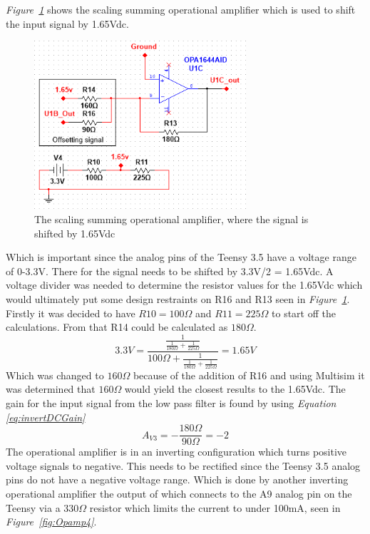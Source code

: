 \textit{Figure~\ref{fig:Opamp3}} shows the scaling summing operational amplifier which is used to shift the input signal by 1.65Vdc. 


\begin{figure}[h]
    \centering
    \includegraphics[width=0.70\textwidth]{graphics/OPamp3.png}
    \caption{The scaling summing operational amplifier, where the signal is shifted by 1.65Vdc}
    \label{fig:Opamp3}
\end{figure}


Which is important since the analog pins of the Teensy 3.5 have a voltage range of 0-3.3V.
There for the signal needs to be shifted by 3.3V/2 = 1.65Vdc.
A voltage divider was needed to determine the resistor values for the 1.65Vdc which would ultimately put some design restraints on R16 and R13 seen in \textit{Figure~\ref{fig:Opamp3}}.
Firstly it was decided to have $R10 = 100\Omega$  and $R11 = 225\Omega$ to start off the calculations.
From that R14 could be calculated as $180\Omega$.
$$3.3V = \frac{\frac{1}{\frac{1}{180\Omega}+\frac{1}{225\Omega}}}{100\Omega+\frac{1}{\frac{1}{180\Omega}+\frac{1}{225\Omega}}} = 1.65V$$
Which was changed to $160\Omega$ because of the addition of R16 and using Multisim it was determined that $160\Omega$ would yield the closest results to the 1.65Vdc.
The gain for the input signal from the low pass filter is found by using \textit{Equation \ref{eq:invertDCGain}}
$$A_{V3} = -\frac{180\Omega}{90\Omega} = -2$$
The operational amplifier is in an inverting configuration which turns positive voltage signals to negative.
This needs to be rectified since the Teensy 3.5 analog pins do not have a negative voltage range.
Which is done by another inverting operational amplifier the output of which connects to the A9 analog pin on the Teensy via a 330$\Omega$ resistor which limits the current to under 100mA, seen in \textit{Figure~\ref{fig:Opamp4}}.

